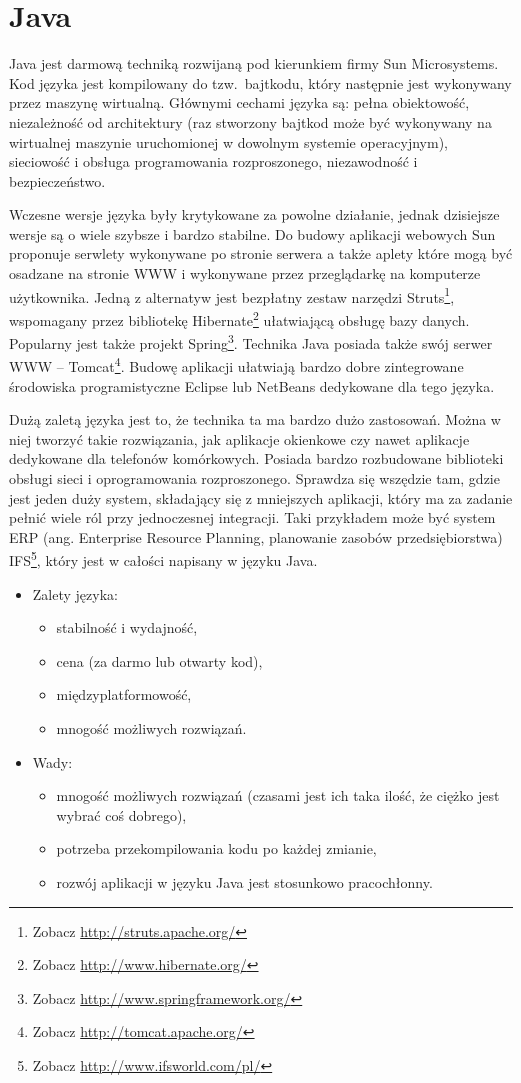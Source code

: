\documentclass[a4paper,12pt,oneside]{report}
\begin{document}
\section{Java}
\label{sec:java}
Java jest darmową techniką rozwijaną pod kierunkiem firmy Sun Microsystems. Kod języka jest kompilowany do tzw.~bajtkodu, który następnie jest wykonywany przez maszynę wirtualną. Głównymi cechami języka są: pełna obiektowość, niezależność od architektury (raz stworzony bajtkod może być wykonywany na wirtualnej maszynie uruchomionej w dowolnym systemie operacyjnym), sieciowość i obsługa programowania rozproszonego, niezawodność i bezpieczeństwo.

Wczesne wersje języka były krytykowane za powolne działanie, jednak dzisiejsze wersje są o wiele szybsze i bardzo stabilne. Do budowy aplikacji webowych Sun proponuje serwlety wykonywane po stronie serwera a także aplety które mogą być osadzane na stronie WWW i wykonywane przez przeglądarkę na komputerze użytkownika. Jedną z alternatyw jest bezpłatny zestaw narzędzi Struts\footnote{Zobacz \url{http://struts.apache.org/}}, wspomagany przez bibliotekę Hibernate\footnote{Zobacz \url{http://www.hibernate.org/}} ułatwiającą obsługę bazy danych. Popularny jest także projekt Spring\footnote{Zobacz \url{http://www.springframework.org/}}. Technika Java posiada także swój serwer WWW -- Tomcat\footnote{Zobacz \url{http://tomcat.apache.org/}}. Budowę aplikacji ułatwiają bardzo dobre zintegrowane środowiska programistyczne Eclipse lub NetBeans dedykowane dla tego języka.

Dużą zaletą języka jest to, że technika ta ma bardzo dużo zastosowań. Można w niej tworzyć takie rozwiązania, jak aplikacje okienkowe czy nawet aplikacje dedykowane dla telefonów komórkowych. Posiada bardzo rozbudowane biblioteki obsługi sieci i oprogramowania rozproszonego. Sprawdza się wszędzie tam, gdzie jest jeden duży system, składający się z mniejszych aplikacji, który ma za zadanie pełnić wiele ról przy jednoczesnej integracji. Taki przykładem może być system ERP (ang. Enterprise Resource Planning, planowanie zasobów przedsiębiorstwa) IFS\footnote{Zobacz \url{http://www.ifsworld.com/pl/}}, który jest w całości napisany w języku Java.
\begin{itemize}
\item Zalety języka:
  \begin{itemize}
  \item stabilność i wydajność,
  \item cena (za darmo lub otwarty kod),
  \item międzyplatformowość,
  \item mnogość możliwych rozwiązań.
  \end{itemize}
\item Wady:
  \begin{itemize}
  \item mnogość możliwych rozwiązań (czasami jest ich taka ilość, że ciężko jest wybrać coś dobrego),
  \item potrzeba przekompilowania kodu po każdej zmianie,
  \item rozwój aplikacji w języku Java jest stosunkowo pracochłonny.
  \end{itemize}
\end{itemize}
\end{document}
